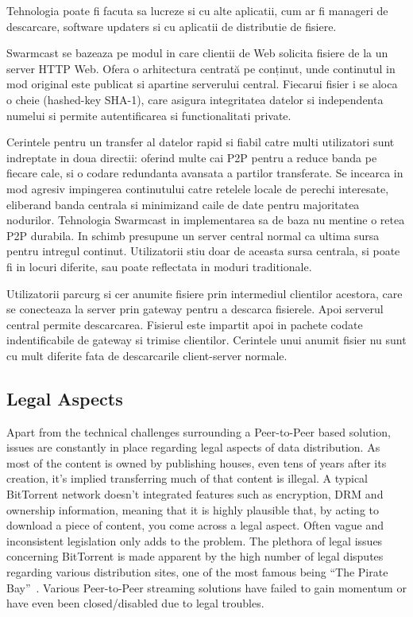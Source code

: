 Tehnologia poate fi facuta sa lucreze si cu alte aplicatii, cum ar fi manageri
de descarcare, software updaters si cu aplicatii de distributie de fisiere.

Swarmcast se bazeaza pe modul in care clientii de Web solicita fisiere de la
un server HTTP Web. Ofera o arhitectura centrată pe conținut, unde continutul
in mod original este publicat si apartine serverului central. Fiecarui fisier
i se aloca o cheie (hashed-key SHA-1), care asigura integritatea datelor si
independenta numelui si permite autentificarea si functionalitati private.

Cerintele pentru un transfer al datelor rapid si fiabil catre multi
utilizatori sunt indreptate in doua directii: oferind multe cai P2P pentru a
reduce banda pe fiecare cale, si o codare redundanta avansata a partilor
transferate. Se incearca in mod agresiv impingerea continutului catre retelele
locale de perechi interesate, eliberand banda centrala si minimizand caile de
date pentru majoritatea nodurilor. Tehnologia Swarmcast in implementarea sa de
baza nu mentine o retea P2P durabila. In schimb presupune un server central
normal ca ultima sursa pentru intregul continut. Utilizatorii stiu doar de
aceasta sursa centrala, si poate fi in locuri diferite, sau poate reflectata
in moduri traditionale.

Utilizatorii parcurg si cer anumite fisiere prin intermediul clientilor
acestora, care se conecteaza la server prin gateway pentru a descarca
fisierele. Apoi serverul central permite descarcarea. Fisierul este impartit
apoi in pachete codate indentificabile de gateway si trimise clientilor.
Cerintele unui anumit fisier nu sunt cu mult diferite fata de descarcarile
client-server normale.

\subsection{Legal Aspects}
\label{subsec:p2p-streaming-legal}

Apart from the technical challenges surrounding a Peer-to-Peer based solution,
issues are constantly in place regarding legal aspects of data distribution.
As most of the content is owned by publishing houses, even tens of years after
its creation, it's implied transferring much of that content is illegal. A
typical BitTorrent network doesn't integrated features such as encryption, DRM
and ownership information, meaning that it is highly plausible that, by acting
to download a piece of content, you come across a legal aspect. Often vague
and inconsistent legislation only adds to the problem. The plethora of legal
issues concerning BitTorrent is made apparent by the high number of legal
disputes regarding various distribution sites, one of the most famous being
``The Pirate Bay''~\cite{pirate-bay}. Various Peer-to-Peer streaming solutions have
failed to gain momentum or have even been closed/disabled due to legal
troubles.

